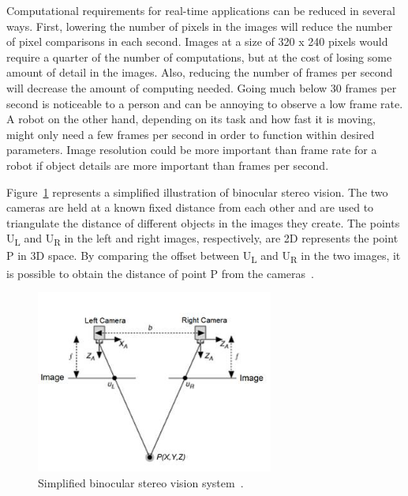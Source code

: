 Computational requirements for real-time applications can be reduced in several ways. First, lowering the number of pixels in the images will reduce the number of pixel comparisons in each second. Images at a size of 320 x 240 pixels would require a quarter of the number of computations, but at the cost of losing some amount of detail in the images. Also, reducing the number of frames per second will decrease the amount of computing needed. Going much below 30 frames per second is noticeable to a person and can be annoying to observe a low frame rate. A robot on the other hand, depending on its task and how fast it is moving, might only need a few frames per second in order to function within desired parameters. Image resolution could be more important than frame rate for a robot if object details are more important than frames per second.

Figure~\ref{fig:sv_diagram} represents a simplified illustration of binocular stereo vision. The two cameras are held at a known fixed distance from each other and are used to triangulate the distance of different objects in the images they create. The points U\textsubscript{L} and U\textsubscript{R} in the left and right images, respectively, are 2D represents the point P in 3D space. By comparing the offset between U\textsubscript{L} and U\textsubscript{R} in the two images, it is possible to obtain the distance of point P from the cameras~\cite{stereoVisionDiagram}.

\begin{figure}[h]
	\begin{center}
		\includegraphics[height=60mm]{figures/stereoVisionDiagram.jpg}
		\captionfonts
		\caption{Simplified binocular stereo vision system~\cite{stereoVisionDiagram}.}
		\label{fig:sv_diagram}
	\end{center}
\end{figure}

